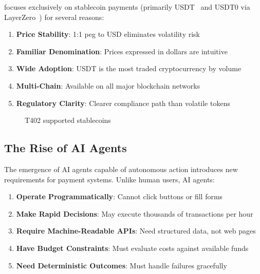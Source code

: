 \tprotocol{} focuses exclusively on stablecoin payments (primarily USDT~\cite{usdt} and USDT0 via LayerZero~\cite{layerzero}) for several reasons:

\begin{enumerate}
    \item \textbf{Price Stability}: 1:1 peg to USD eliminates volatility risk
    \item \textbf{Familiar Denomination}: Prices expressed in dollars are intuitive
    \item \textbf{Wide Adoption}: USDT is the most traded cryptocurrency by volume
    \item \textbf{Multi-Chain}: Available on all major blockchain networks
    \item \textbf{Regulatory Clarity}: Clearer compliance path than volatile tokens
\end{enumerate}

\begin{figure}[htbp]
\centering
{}
\caption{T402 supported stablecoins}
\label{fig:stablecoins}
\end{figure}

\subsection{The Rise of AI Agents}

The emergence of AI agents capable of autonomous action introduces new requirements for payment systems. Unlike human users, AI agents:

\begin{enumerate}
    \item \textbf{Operate Programmatically}: Cannot click buttons or fill forms
    \item \textbf{Make Rapid Decisions}: May execute thousands of transactions per hour
    \item \textbf{Require Machine-Readable APIs}: Need structured data, not web pages
    \item \textbf{Have Budget Constraints}: Must evaluate costs against available funds
    \item \textbf{Need Deterministic Outcomes}: Must handle failures gracefully
\end{enumerate}

